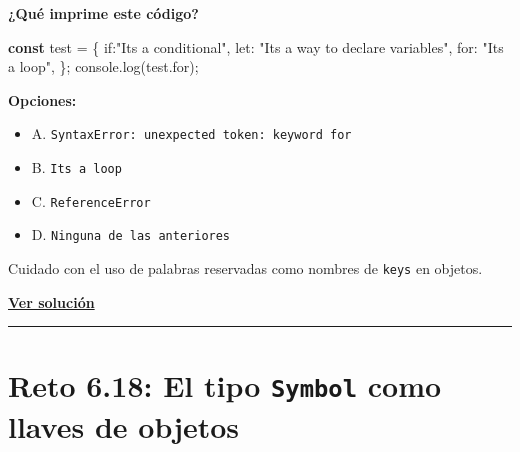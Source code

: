 \documentclass[
  letterpaper,
  DIV=11,
  numbers=noendperiod]{scrreprt}
\newenvironment{Shaded}{\begin{snugshade}}{\end{snugshade}}
\newcommand{\AttributeTok}[1]{\textcolor[rgb]{0.40,0.45,0.13}{#1}}
\newcommand{\BuiltInTok}[1]{\textcolor[rgb]{0.00,0.23,0.31}{#1}}
\newcommand{\DataTypeTok}[1]{\textcolor[rgb]{0.68,0.00,0.00}{#1}}
\newcommand{\FunctionTok}[1]{\textcolor[rgb]{0.28,0.35,0.67}{#1}}
\newcommand{\KeywordTok}[1]{\textcolor[rgb]{0.00,0.23,0.31}{\textbf{#1}}}
\newcommand{\NormalTok}[1]{\textcolor[rgb]{0.00,0.23,0.31}{#1}}
\newcommand{\OperatorTok}[1]{\textcolor[rgb]{0.37,0.37,0.37}{#1}}
\newcommand{\StringTok}[1]{\textcolor[rgb]{0.13,0.47,0.30}{#1}}
\providecommand{\tightlist}{%
  \setlength{\itemsep}{0pt}\setlength{\parskip}{0pt}}
\begin{document}
\textbf{¿Qué imprime este código?}

\begin{Shaded}
\begin{Highlighting}[]
\KeywordTok{const}\NormalTok{ test }\OperatorTok{=}\NormalTok{ \{}
  \DataTypeTok{if}\OperatorTok{:}\StringTok{"It\textquotesingle{}s a conditional"}\OperatorTok{,}
  \DataTypeTok{let}\OperatorTok{:} \StringTok{"It\textquotesingle{}s a way to declare variables"}\OperatorTok{,}
  \DataTypeTok{for}\OperatorTok{:} \StringTok{"It\textquotesingle{}s a loop"}\OperatorTok{,}
\NormalTok{\}}\OperatorTok{;}
\BuiltInTok{console}\OperatorTok{.}\FunctionTok{log}\NormalTok{(test}\OperatorTok{.}\AttributeTok{for}\NormalTok{)}\OperatorTok{;} 
\end{Highlighting}
\end{Shaded}

\textbf{Opciones:}

\begin{itemize}
\tightlist
\item
  A.
  \texttt{SyntaxError:\ unexpected\ token:\ keyword\ \textquotesingle{}for\textquotesingle{}}
\item
  B. \texttt{It\textquotesingle{}s\ a\ loop}
\item
  C. \texttt{ReferenceError}
\item
  D. \texttt{Ninguna\ de\ las\ anteriores}
\end{itemize}

\begin{tcolorbox}[enhanced jigsaw, left=2mm, toprule=.15mm, leftrule=.75mm, breakable, colback=white, coltitle=black, bottomtitle=1mm, arc=.35mm, rightrule=.15mm, colframe=quarto-callout-tip-color-frame, opacitybacktitle=0.6, toptitle=1mm, opacityback=0, titlerule=0mm, title=\textcolor{quarto-callout-tip-color}{\faLightbulb}\hspace{0.5em}{Pista}, bottomrule=.15mm, colbacktitle=quarto-callout-tip-color!10!white]

Cuidado con el uso de palabras reservadas como nombres de \texttt{keys}
en objetos.

\end{tcolorbox}

\textbf{\hyperref[sec-sol-cap6-reto17]{Ver solución}}

\begin{center}\rule{0.5\linewidth}{0.5pt}\end{center}

\section{\texorpdfstring{Reto 6.18: El tipo \texttt{Symbol} como llaves
de
objetos}{Reto 6.18: El tipo Symbol como llaves de objetos}}\label{sec-cap6-reto18}
\end{document}
